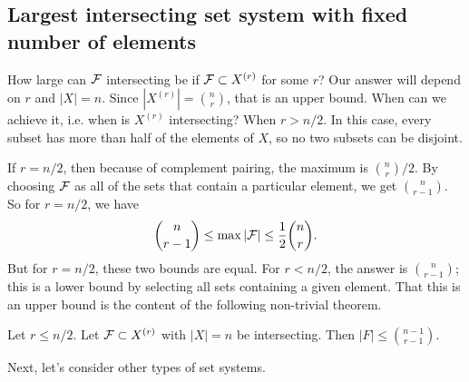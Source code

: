 \subsection*{Largest intersecting set system with fixed number of elements}
How large can $\mathcal{F}$ intersecting be if $\mathcal{F}\subset X^{(r)}$ for some $r$? Our answer will depend on $r$ and $|X| = n$. Since $|X^{(r)}| = {n \choose r}$, that is an upper bound. When can we achieve it, i.e. when is $X^{(r)}$ intersecting? When $r > n/2$. In this case, every subset has more than half of the elements of $X$, so no two subsets can be disjoint.

If $r = n/2$, then because of  complement pairing, the maximum is ${n \choose r}/2$. By choosing $\mathcal{F}$ as all of the sets that contain a particular element, we get ${n \choose r-1}$. So for $r=n/2$, we have
\[
 {n\choose r-1} \leq \max |\mathcal{F}| \leq \frac{1}{2}{n\choose r}.
\]
But for $r=n/2$, these two bounds are equal.
For $r< n/2$, the answer is ${n \choose r-1}$; this is a lower bound by selecting all sets containing a given element.  That this is an upper bound is the content of the following non-trivial theorem.
\begin{theorem*} 
Let $r\leq n/2$. Let $\mathcal{F}\subset X^{(r)}$ with $|X| = n$ be intersecting. Then $|F| \leq { n-1\choose r-1}$.
\end{theorem*}

Next, let's consider other types of set systems.
